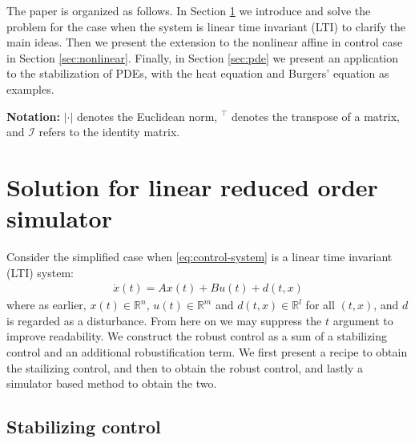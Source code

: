 \documentclass[letterpaper, 10 pt, conference]{ieeeconf}  %
\newcommand{\tp}{^\top}
\newcommand{\R}{\mathbb{R}}
\newcommand{\normal}{\mathcal{N}}
\newcommand{\one}{\mathds{1}}
\newcommand{\id}{\mathcal{I}}
\begin{document}
The paper is organized as follows. In Section \ref{sec:linear} we introduce and solve the problem for the case when the system is linear time invariant (LTI) to clarify the main ideas. Then we present the extension to the nonlinear affine in control case in Section \ref{sec:nonlinear}. 
Finally, in Section \ref{sec:pde} we present an application to the stabilization of PDEs, with the heat equation and Burgers' equation as examples. 





\textbf{Notation:} %
$|\cdot|$ denotes the Euclidean norm, $\tp$ denotes the transpose of a matrix, and $\id$ refers to the identity matrix.

\section{Solution for linear reduced order simulator}
\label{sec:linear}

Consider the simplified case when \eqref{eq:control-system} is a linear time invariant (LTI) system:
\begin{align}
\dot{x}(t) = Ax(t) + Bu(t) + d(t,x)
\label{eq:lin-control-system}
\end{align}
where as earlier, $x(t) \in \R^n$, $u(t) \in \R^m$ and 
$d(t,x) \in \R^l$ for all $(t,x)$, and $d$ is regarded as a disturbance. From here on we may suppress the $t$ argument to improve readability. We construct the robust control as a sum of a stabilizing control and an additional robustification term. We first present a recipe to obtain the stailizing control, and then to obtain the robust control, and lastly a simulator based method to obtain the two. 

\subsection{Stabilizing control}
\end{document}
